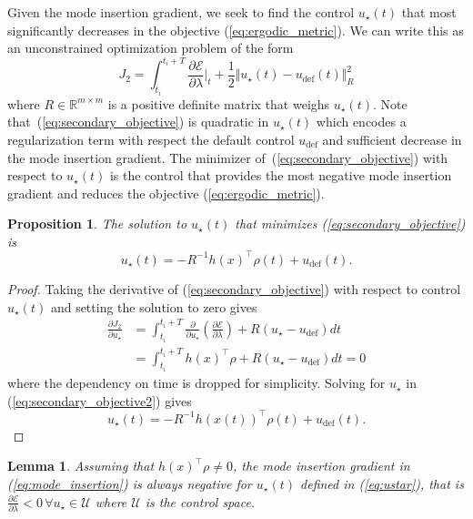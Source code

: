 \documentclass[letterpaper, 10 pt, conference]{ieeeconf}  %
\newtheorem{proposition}{Proposition}
\newtheorem{lemma}{Lemma}
\begin{document}
Given the mode insertion gradient, we seek to find the control $u_\star(t)$ that most significantly decreases in the objective (\ref{eq:ergodic_metric}).
We can write this as an unconstrained optimization problem of the form
\begin{equation}\label{eq:secondary_objective}
J_2 = \int_{t_i}^{t_i + T} \frac{\partial \mathcal{E}}{\partial \lambda}\Big \vert_t + \frac{1}{2}\Vert u_\star(t) - u_\text{def}(t) \Vert_R^2
\end{equation}
where $R \in \mathbb{R}^{m \times m}$ is a positive definite matrix that weighs $u_\star(t)$.
Note that~(\ref{eq:secondary_objective}) is quadratic in $u_\star(t)$ which encodes a regularization term with respect the default control $u_\text{def}$ and sufficient decrease in the mode insertion gradient. 
The minimizer of~(\ref{eq:secondary_objective}) with respect to $u_\star(t)$ is the control that provides the most negative mode insertion gradient and reduces the objective (\ref{eq:ergodic_metric}).
\begin{proposition}
The solution to $u_\star(t)$ that minimizes (\ref{eq:secondary_objective}) is
\begin{equation} \label{eq:ustar}
u_\star(t) = -R^{-1} h(x)^\top \rho(t) + u_\text{def}(t).
\end{equation}
\end{proposition}
\begin{proof}
Taking the derivative of (\ref{eq:secondary_objective}) with respect to control $u_\star(t)$ and setting the solution to zero gives
\begin{align}\label{eq:secondary_objective2}
\frac{\partial J_2}{\partial u_\star} & = \int_{t_i}^{t_i + T} \frac{\partial }{\partial u_\star} \left( \frac{\partial \mathcal{E}}{\partial \lambda}\right) + R(u_\star - u_\text{def}) dt \nonumber \\
& = \int_{t_i}^{t_i + T}  h(x)^\top\rho + R(u_\star - u_\text{def}) dt = 0
\end{align}
where the dependency on time is dropped for simplicity.
Solving for $u_\star$ in (\ref{eq:secondary_objective2}) gives
\begin{equation*}
u_\star(t) = -R^{-1}h(x(t))^\top\rho(t) + u_\text{def}(t).
\end{equation*}
\end{proof}
\begin{lemma}\label{lemma:mode_insert}
Assuming that $h(x)^\top \rho \neq 0$, the mode insertion gradient in (\ref{eq:mode_insertion}) is always negative for $u_\star(t)$ defined in (\ref{eq:ustar}), that is $\frac{\partial \mathcal{E}}{\partial \lambda} < 0 \,  \forall u_\star \in \mathcal{U}$ where $\mathcal{U}$ is the control space.
\end{lemma}
\end{document}
